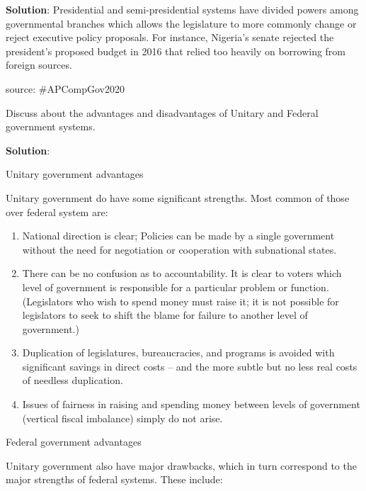 \documentclass[
  openany]{book}
\newcommand{\question}{\item}
\newenvironment{solution}{ {\bfseries Solution}:}{}
\begin{document}
\begin{questions}
\begin{solution}
Presidential and semi-presidential systems have divided powers among governmental branches which allows the legislature to more commonly change or reject executive policy proposals. For instance, Nigeria's senate rejected the president's proposed budget in 2016 that relied too heavily on borrowing from foreign sources.

source: \#APCompGov2020
\end{solution}

\question Discuss about the advantages and disadvantages of Unitary and Federal government systems.

\begin{solution}

Unitary government advantages

Unitary government do have some significant strengths. Most common of those over federal system are:

\begin{enumerate}
\item National direction is clear; Policies can be made by a single government without the need for negotiation or cooperation with subnational states.
\item There can be no confusion as to accountability. It is clear to voters which level of government is responsible for a particular problem or function. (Legislators who wish to spend money must raise it; it is not possible for legislators to seek to shift the blame for failure to another level of government.)
\item Duplication of legislatures, bureaucracies, and programs is avoided with significant savings in direct costs -- and the more subtle but no less real costs of needless duplication.
\item Issues of fairness in raising and spending money between levels of government (vertical fiscal imbalance) simply do not arise.
\end{enumerate}

Federal government advantages

Unitary government also have major drawbacks, which in turn correspond to the major strengths of federal systems. These include:


\end{solution}
\end{questions}
\end{document}
